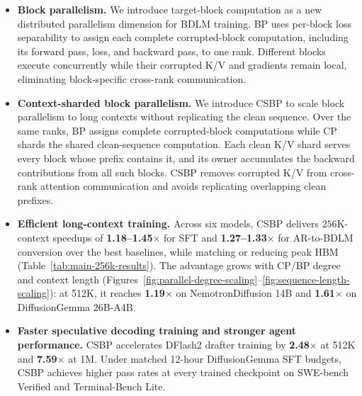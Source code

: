 \begin{itemize}
    \item \textbf{Block parallelism.} We introduce target-block computation as
    a new distributed parallelism dimension for BDLM training. BP uses
    per-block loss separability to assign each complete corrupted-block
    computation, including its forward pass, loss, and backward pass, to one
    rank. Different blocks execute concurrently while their corrupted K/V and
    gradients remain local, eliminating block-specific cross-rank communication.

    \item \textbf{Context-sharded block parallelism.} We introduce CSBP to
    scale block parallelism to long contexts without replicating the clean
    sequence. Over the same ranks, BP assigns complete corrupted-block
    computations while CP shards the shared clean-sequence computation. Each
    clean K/V shard serves every block whose prefix contains it, and its owner
    accumulates the backward contributions from all such blocks. CSBP removes
    corrupted K/V from cross-rank attention communication and avoids
    replicating overlapping clean prefixes.

    \item \textbf{Efficient long-context training.} Across six models,
    CSBP delivers $256$K-context speedups of
    \textbf{1.18--1.45$\boldsymbol{\times}$} for SFT and
    \textbf{1.27--1.33$\boldsymbol{\times}$} for AR-to-BDLM conversion over the best baselines,
    while matching or reducing peak HBM (Table~\ref{tab:main-256k-results}).
    The advantage grows with CP/BP degree and context length
    (Figures~\ref{fig:parallel-degree-scaling}--\ref{fig:sequence-length-scaling}):
    at 512K, it reaches \textbf{1.19$\boldsymbol{\times}$} on
    NemotronDiffusion 14B and \textbf{1.61$\boldsymbol{\times}$} on
    DiffusionGemma 26B-A4B.

    \item \textbf{Faster speculative decoding training and stronger agent performance.}
    CSBP accelerates DFlash2 drafter training by
    \textbf{2.48$\boldsymbol{\times}$} at 512K and
    \textbf{7.59$\boldsymbol{\times}$} at 1M. Under matched 12-hour
    DiffusionGemma SFT budgets, CSBP achieves higher pass rates at every trained
    checkpoint on SWE-bench Verified and Terminal-Bench Lite.
\end{itemize}
